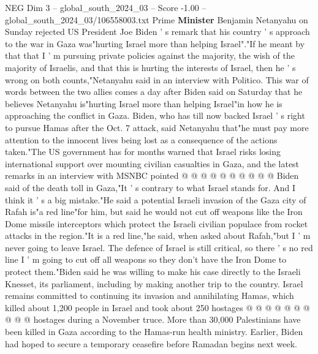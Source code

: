 \begin{textsample}{NEG Dim 3 – global\_south\_2024\_03 – Score -1.00 – global\_south\_2024\_03/106558003.txt}  \label{ex:f3_neg_045}
Prime \textbf{Minister} Benjamin Netanyahu on Sunday rejected US President Joe Biden ' s remark that his country ' s approach to the war in Gaza was"hurting Israel more than helping Israel"."If he meant by that that I ' m pursuing private policies against the majority, the wish of the majority of Israelis, and that this is hurting the interests of Israel, then he ' s wrong on both counts,"Netanyahu said in an interview with Politico.
This war of words between the two allies comes a day after Biden said on Saturday that he believes Netanyahu is"hurting Israel more than helping Israel"in how he is approaching the conflict in Gaza.
Biden, who has till now backed Israel ' s right to pursue Hamas after the Oct. 7 attack, said Netanyahu that"he must pay more attention to the innocent lives being lost as a consequence of the actions taken."The US government has for months warned that Israel risks losing international support over mounting civilian casualties in Gaza, and the latest remarks in an interview with MSNBC pointed @ @ @ @ @ @ @ @ @ @ Biden said of the death toll in Gaza,"It ' s contrary to what Israel stands for.
And I think it ' s a big mistake."He said a potential Israeli invasion of the Gaza city of Rafah is"a red line"for him, but said he would not cut off weapons like the Iron Dome missile interceptors which protect the Israeli civilian populace from rocket attacks in the region."It is a red line,"he said, when asked about Rafah,"but I ' m never going to leave Israel.
The defence of Israel is still critical, so there ' s no red line I ' m going to cut off all weapons so they don't have the Iron Dome to protect them."Biden said he was willing to make his case directly to the Israeli Knesset, its parliament, including by making another trip to the country.
Israel remains committed to continuing its invasion and annihilating Hamas, which killed about 1,200 people in Israel and took about 250 hostages @ @ @ @ @ @ @ @ @ @ hostages during a November truce.
More than 30,000 Palestinians have been killed in Gaza according to the Hamas-run health ministry.
Earlier, Biden had hoped to secure a temporary ceasefire before Ramadan begins next week.

\end{textsample}
